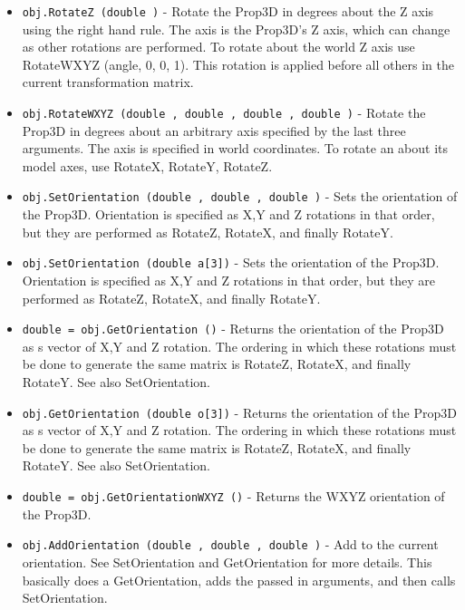 \begin{itemize}
\item  \verb|obj.RotateZ (double )| -  Rotate the Prop3D in degrees about the Z axis using the right hand
 rule. The axis is the Prop3D's Z axis, which can change as other
 rotations are performed.  To rotate about the world Z axis use
 RotateWXYZ (angle, 0, 0, 1). This rotation is applied before all
 others in the current transformation matrix.

\item  \verb|obj.RotateWXYZ (double , double , double , double )| -  Rotate the Prop3D in degrees about an arbitrary axis specified by
 the last three arguments. The axis is specified in world
 coordinates. To rotate an about its model axes, use RotateX,
 RotateY, RotateZ.

\item  \verb|obj.SetOrientation (double , double , double )| -  Sets the orientation of the Prop3D.  Orientation is specified as
 X,Y and Z rotations in that order, but they are performed as
 RotateZ, RotateX, and finally RotateY.

\item  \verb|obj.SetOrientation (double a[3])| -  Sets the orientation of the Prop3D.  Orientation is specified as
 X,Y and Z rotations in that order, but they are performed as
 RotateZ, RotateX, and finally RotateY.

\item  \verb|double = obj.GetOrientation ()| -  Returns the orientation of the Prop3D as s vector of X,Y and Z rotation.
 The ordering in which these rotations must be done to generate the 
 same matrix is RotateZ, RotateX, and finally RotateY. See also 
 SetOrientation.

\item  \verb|obj.GetOrientation (double o[3])| -  Returns the orientation of the Prop3D as s vector of X,Y and Z rotation.
 The ordering in which these rotations must be done to generate the 
 same matrix is RotateZ, RotateX, and finally RotateY. See also 
 SetOrientation.

\item  \verb|double = obj.GetOrientationWXYZ ()| -  Returns the WXYZ orientation of the Prop3D. 

\item  \verb|obj.AddOrientation (double , double , double )| -  Add to the current orientation. See SetOrientation and
 GetOrientation for more details. This basically does a
 GetOrientation, adds the passed in arguments, and then calls
 SetOrientation.


\end{itemize}
